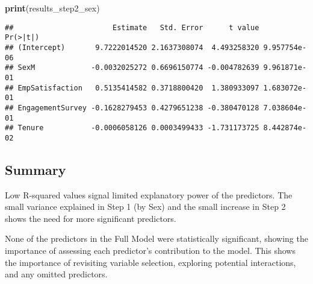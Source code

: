 \documentclass[
]{article}
\newenvironment{Shaded}{\begin{snugshade}}{\end{snugshade}}
\newcommand{\CommentTok}[1]{\textcolor[rgb]{0.56,0.35,0.01}{\textit{#1}}}
\newcommand{\DecValTok}[1]{\textcolor[rgb]{0.00,0.00,0.81}{#1}}
\newcommand{\FunctionTok}[1]{\textcolor[rgb]{0.13,0.29,0.53}{\textbf{#1}}}
\newcommand{\NormalTok}[1]{#1}
\newcommand{\OtherTok}[1]{\textcolor[rgb]{0.56,0.35,0.01}{#1}}
\newcommand{\SpecialCharTok}[1]{\textcolor[rgb]{0.81,0.36,0.00}{\textbf{#1}}}
\begin{document}
\begin{Shaded}
\begin{Highlighting}[]
\FunctionTok{print}\NormalTok{(results\_step2\_sex)}
\end{Highlighting}
\end{Shaded}

\begin{verbatim}
##                       Estimate   Std. Error      t value     Pr(>|t|)
## (Intercept)       9.7222014520 2.1637308074  4.493258320 9.957754e-06
## SexM             -0.0032025272 0.6696150774 -0.004782639 9.961871e-01
## EmpSatisfaction   0.5135414582 0.3718800420  1.380933097 1.683072e-01
## EngagementSurvey -0.1628279453 0.4279651238 -0.380470128 7.038604e-01
## Tenure           -0.0006058126 0.0003499433 -1.731173725 8.442874e-02
\end{verbatim}

\begin{Shaded}
\end{Shaded}

\subsection{Summary}\label{summary-3}

Low R-squared values signal limited explanatory power of the predictors.
The small variance explained in Step 1 (by Sex) and the small increase
in Step 2 shows the need for more significant predictors.

None of the predictors in the Full Model were statistically significant,
showing the importance of assessing each predictor's contribution to the
model. This shows the importance of revisiting variable selection,
exploring potential interactions, and any omitted predictors.
\end{document}
